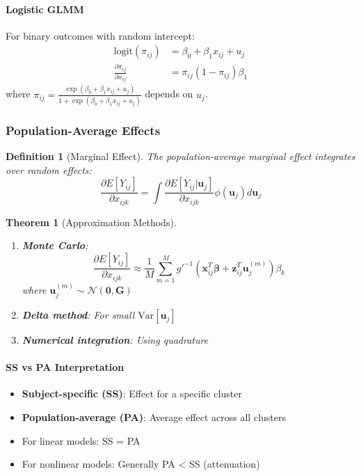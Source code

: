 \documentclass{article}
\newtheorem{definition}{Definition}
\newtheorem{theorem}{Theorem}
\begin{document}
\paragraph*{Logistic GLMM}
For binary outcomes with random intercept:
\begin{align}
\text{logit}(\pi_{ij}) &= \beta_0 + \beta_1 x_{ij} + u_j \\
\frac{\partial \pi_{ij}}{\partial x_{ij}} &= \pi_{ij}(1-\pi_{ij})\beta_1
\end{align}
where $\pi_{ij} = \frac{\exp(\beta_0 + \beta_1 x_{ij} + u_j)}{1 + \exp(\beta_0 + \beta_1 x_{ij} + u_j)}$ depends on $u_j$.


\subsubsection{Population-Average Effects}

\begin{definition}[Marginal Effect]
The population-average marginal effect integrates over random effects:
\begin{equation}
\frac{\partial E[Y_{ij}]}{\partial x_{ijk}} = \int \frac{\partial E[Y_{ij}|\mathbf{u}_j]}{\partial x_{ijk}} \phi(\mathbf{u}_j)d\mathbf{u}_j
\end{equation}
\end{definition}

\begin{theorem}[Approximation Methods]
\begin{enumerate}
    \item \textbf{Monte Carlo}: 
    \begin{equation}
    \frac{\partial E[Y_{ij}]}{\partial x_{ijk}} \approx \frac{1}{M}\sum_{m=1}^M g'^{-1}(\mathbf{x}_{ij}^T\boldsymbol{\beta} + \mathbf{z}_{ij}^T\mathbf{u}_j^{(m)})\beta_k
    \end{equation}
    where $\mathbf{u}_j^{(m)} \sim \mathcal{N}(\mathbf{0}, \mathbf{G})$
    
    \item \textbf{Delta method}: For small $\text{Var}[\mathbf{u}_j]$
    \item \textbf{Numerical integration}: Using quadrature
\end{enumerate}
\end{theorem}

\paragraph*{SS vs PA Interpretation}
\begin{itemize}
    \item \textbf{Subject-specific (SS)}: Effect for a specific cluster
    \item \textbf{Population-average (PA)}: Average effect across all clusters
    \item For linear models: SS = PA
    \item For nonlinear models: Generally PA < SS (attenuation)
\end{itemize}
\end{document}
